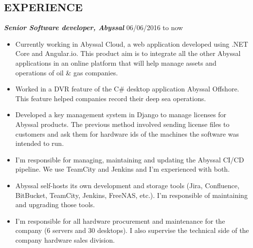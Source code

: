 \documentclass[line,margin]{resume}
\begin{document}
\begin{resume}
\section{EXPERIENCE}
    {\sl\bf Senior Software developer, Abyssal} \hfill 06/06/2016 to now
    \begin{itemize}
        \item Currently working in Abyssal Cloud, a web application developed using .NET Core and Angular.io. This product aim is to integrate all the other Abyssal applications in an online platform that will help manage assets and operations of oil \& gas companies.
        \item Worked in a DVR feature of the C\# desktop application Abyssal Offshore. This feature helped companies record their deep sea operations.
        \item Developed a key management system in Django to manage licenses for Abyssal products. The previous method involved sending license files to customers and ask them for hardware ids of the machines the software was intended to run.
        \item I'm responsible for managing, maintaining and updating the Abyssal CI/CD pipeline. We use TeamCity and Jenkins and I'm experienced with both.
        \item Abyssal self-hosts its own development and storage tools (Jira, Confluence, BitBucket, TeamCity, Jenkins, FreeNAS, etc.). I'm responsible of maintaining and upgrading those tools.
        \item I’m responsible for all hardware procurement and maintenance for the company (6 servers and 30 desktops). I also supervise the technical side of the company hardware sales division.
    \end{itemize}


\end{resume}
\end{document}
